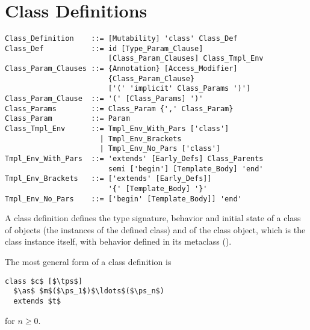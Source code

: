 \section{Class Definitions}
\label{sec:class-definitions}

\syntax\begin{lstlisting}
Class_Definition    ::= [Mutability] 'class' Class_Def
Class_Def           ::= id [Type_Param_Clause] 
                        [Class_Param_Clauses] Class_Tmpl_Env
Class_Param_Clauses ::= {Annotation} [Access_Modifier] 
                        {Class_Param_Clause}
                        ['(' 'implicit' Class_Params ')']
Class_Param_Clause  ::= '(' [Class_Params] ')'
Class_Params        ::= Class_Param {',' Class_Param}
Class_Param         ::= Param
Class_Tmpl_Env      ::= Tmpl_Env_With_Pars ['class']
                      | Tmpl_Env_Brackets
                      | Tmpl_Env_No_Pars ['class']
Tmpl_Env_With_Pars  ::= 'extends' [Early_Defs] Class_Parents
                        semi ['begin'] [Template_Body] 'end'
Tmpl_Env_Brackets   ::= ['extends' [Early_Defs]] 
                        '{' [Template_Body] '}'
Tmpl_Env_No_Pars    ::= ['begin' [Template_Body]] 'end'
\end{lstlisting}

A class definition defines the type signature, behavior and initial state of a class of objects (the instances of the defined class) and of the class object, which is the class instance itself, with behavior defined in its metaclass (). 

The most general form of a class definition is
\begin{lstlisting}
class $c$ [$\tps$]
  $\as$ $m$($\ps_1$)$\ldots$($\ps_n$)
  extends $t$
\end{lstlisting}
for $n \geq 0$. 

